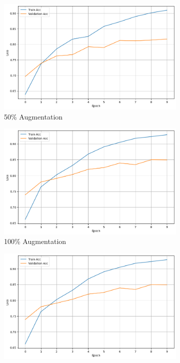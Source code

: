 \documentclass{article}
\begin{document}
\begin{figure}[ht]
  \centering
  \begin{subfigure}[b]{0.3\textwidth}
    \includegraphics[width=\textwidth]{img/random_50.png}
    \caption{50\% Augmentation}
    \label{fig:random_50}
  \end{subfigure}
  \hfill
  \begin{subfigure}[b]{0.3\textwidth}
    \includegraphics[width=\textwidth]{img/random_100.png}
    \caption{100\% Augmentation}
    \label{fig:random_100}
  \end{subfigure}
  \hfill
  \begin{subfigure}[b]{0.3\textwidth}
    \includegraphics[width=\textwidth]{img/random_100.png}

\end{subfigure}
\end{figure}
\end{document}
